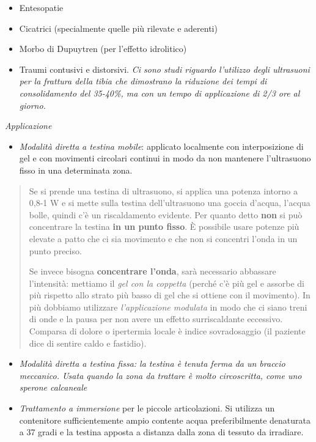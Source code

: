 \documentclass[]{article}
\begin{document}
\begin{itemize}
\item
  Entesopatie
\item
  Cicatrici (specialmente quelle più rilevate e aderenti)
\item
  Morbo di Dupuytren (per l'effetto idrolitico)
\item
  Traumi contusivi e distorsivi. \emph{Ci sono studi riguardo l'utilizzo
  degli ultrasuoni per la frattura della tibia che dimostrano la
  riduzione dei tempi di consolidamento del 35-40\%, ma con un tempo di
  applicazione di 2/3 ore al giorno.}
\end{itemize}

\emph{Applicazione}

\begin{itemize}
\item
  \emph{Modalità diretta} \emph{a testina mobile}: applicato localmente
  con interposizione di gel e con movimenti circolari continui in modo
  da non mantenere l'ultrasuono fisso in una determinata zona.
\end{itemize}

\begin{quote}
Se si prende una testina di ultrasuono, si applica una potenza intorno a
0,8-1 W e si mette sulla testina dell'ultrasuono una goccia d'acqua,
l'acqua bolle, quindi c'è un riscaldamento evidente. Per quanto detto
\textbf{non} si può concentrare la testina \textbf{in un punto fisso}. È
possibile usare potenze più elevate a patto che ci sia movimento e che
non si concentri l'onda in un punto preciso.

Se invece bisogna \textbf{concentrare l'onda}, sarà necessario abbassare
l'intensità: mettiamo il \emph{gel con la coppetta} (perché c'è più gel
e assorbe di più rispetto allo strato più basso di gel che si ottiene
con il movimento). In più dobbiamo utilizzare \emph{l'applicazione
modulata} in modo che ci siano treni di onde e la pausa per non avere un
effetto surriscaldante eccessivo. Comparsa di dolore o ipertermia locale
è indice sovradosaggio (il paziente dice di sentire caldo e fastidio).
\end{quote}

\begin{itemize}
\item
  \emph{\emph{Modalità diretta a testina fissa: la testina è tenuta
  ferma da un braccio meccanico. Usata quando la zona da trattare è
  molto circoscritta, come uno sperone calcaneale}}
\item
  \emph{Trattamento a immersione} per le piccole articolazioni. Si
  utilizza un contenitore sufficientemente ampio contente acqua
  preferibilmente denaturata a 37 gradi e la testina apposta a distanza
  dalla zona di tessuto da irradiare.
\end{itemize}
\end{document}
